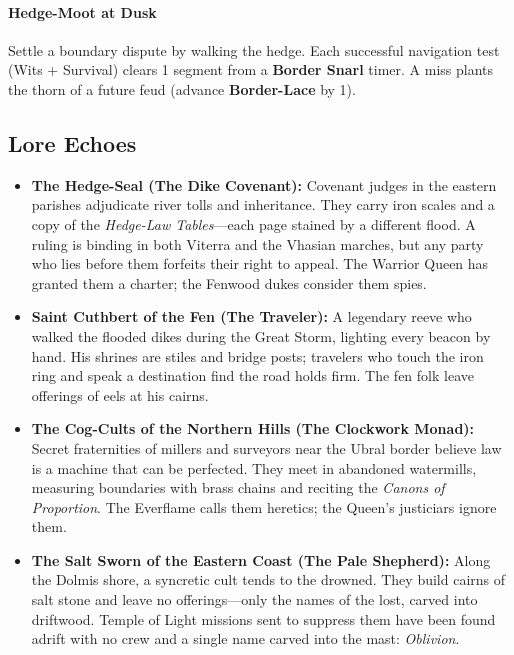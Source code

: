 \begin{itemize}[nosep]
\paragraph{Hedge-Moot at Dusk}
Settle a boundary dispute by walking the hedge. Each successful navigation test (Wits + Survival) clears 1 segment from a \textbf{Border Snarl} timer. A miss plants the thorn of a future feud (advance \textbf{Border-Lace} by 1).

\subsection{Lore Echoes}
\label{sec:vhasia-lore}

\begin{itemize}[nosep]
  \item \textbf{The Hedge-Seal (The Dike Covenant):} Covenant judges in the eastern parishes adjudicate river tolls and inheritance. They carry iron scales and a copy of the \emph{Hedge-Law Tables}---each page stained by a different flood. A ruling is binding in both Viterra and the Vhasian marches, but any party who lies before them forfeits their right to appeal. The Warrior Queen has granted them a charter; the Fenwood dukes consider them spies.
  \item \textbf{Saint Cuthbert of the Fen (The Traveler):} A legendary reeve who walked the flooded dikes during the Great Storm, lighting every beacon by hand. His shrines are stiles and bridge posts; travelers who touch the iron ring and speak a destination find the road holds firm. The fen folk leave offerings of eels at his cairns.
  \item \textbf{The Cog-Cults of the Northern Hills (The Clockwork Monad):} Secret fraternities of millers and surveyors near the Ubral border believe law is a machine that can be perfected. They meet in abandoned watermills, measuring boundaries with brass chains and reciting the \emph{Canons of Proportion}. The Everflame calls them heretics; the Queen's justiciars ignore them.
  \item \textbf{The Salt Sworn of the Eastern Coast (The Pale Shepherd):} Along the Dolmis shore, a syncretic cult tends to the drowned. They build cairns of salt stone and leave no offerings---only the names of the lost, carved into driftwood. Temple of Light missions sent to suppress them have been found adrift with no crew and a single name carved into the mast: \emph{Oblivion}.
\end{itemize}


\end{itemize}
